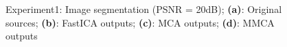 \begin{figure}[!htbp]
{\begin{minipage}[b]{0.23\linewidth}
\end{minipage}} 
\caption{Experiment1: Image segmentation (PSNR = 20dB); \textbf{(a)}: Original sources; \textbf{(b)}: FastICA outputs; \textbf{(c)}: MCA outputs; \textbf{(d)}: MMCA outputs}
\label{segmentation_Im}
\end{figure}


